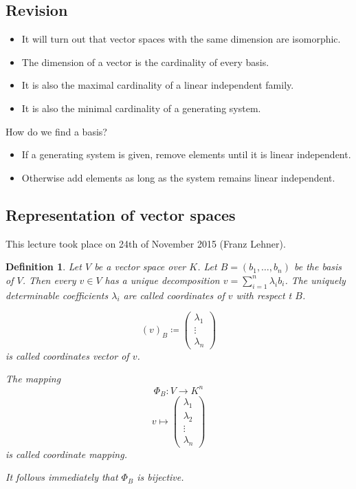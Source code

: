 \documentclass[a4paper,landscape,twocolumn]{article}
\newcommand\meta[3]{This #1 took place on #2 (#3).\par}
\newtheorem{defi}{Definition}
\begin{document}
\subsection{Revision}

\begin{itemize}
  \item It will turn out that vector spaces with the same dimension are isomorphic.
  \item The dimension of a vector is the cardinality of every basis.
  \item It is also the maximal cardinality of a linear independent family.
  \item It is also the minimal cardinality of a generating system.
\end{itemize}

How do we find a basis?

\begin{itemize}
  \item If a generating system is given, remove elements until it is linear independent.
  \item Otherwise add elements as long as the system remains linear independent.
\end{itemize}

\subsection{Representation of vector spaces}

\meta{lecture}{24th of November 2015}{Franz Lehner}

\begin{defi}
  Let $V$ be a vector space over $K$. Let $B = (b_1, \dots, b_n)$ be the basis of $V$.
  Then every $v \in V$ has a unique decomposition $v = \sum_{i=1}^n \lambda_i b_i$.
  The uniquely determinable coefficients $\lambda_i$ are called \emph{coordinates} of $v$ with respect t $B$.

  \[ (v)_B \coloneqq \begin{pmatrix} \lambda_1 \\ \vdots \\ \lambda_n \end{pmatrix} \]
  is called \emph{coordinates vector} of $v$.

  The mapping
  \[ \Phi_B: V \rightarrow K^n \]
  \[ v \mapsto \begin{pmatrix} \lambda_1 \\ \lambda_2 \\ \vdots \\ \lambda_n \end{pmatrix} \]
  is called \emph{coordinate mapping}.

  It follows immediately that $\Phi_B$ is bijective.
\end{defi}
\end{document}

